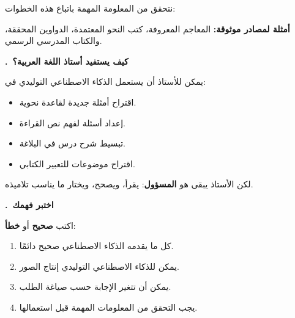 \documentclass[a4paper]{article}
\newcounter{qism}
\newcommand{\qism}[1]{%
    \stepcounter{qism}%
    \par\bigskip
    {\large\khatt\bfseries{\color{asasi}\arabic{qism}.}\ {\color{dakin}#1}}\par
    \vspace{-2pt}{\color{black!20}\rule{\linewidth}{0.6pt}}\par\nopagebreak[4]
    \smallskip}
\newcommand{\kalima}[2][]{\textbf{#2}}
\begin{document}
نتحقق من المعلومة المهمة باتباع هذه الخطوات:

\begin{center}
\end{center}

\textbf{أمثلة لمصادر موثوقة:} المعاجم المعروفة، كتب النحو المعتمدة،
الدواوين المحققة، والكتاب المدرسي الرسمي.

\qism{كيف يستفيد أستاذ اللغة العربية؟}

\begin{arabiyya}
يمكن للأستاذ أن يستعمل الذكاء الاصطناعي التوليدي في:
\begin{itemize}
    \item اقتراح أمثلة جديدة لقاعدة نحوية.
    \item إعداد أسئلة لفهم نص القراءة.
    \item تبسيط شرح درس في البلاغة.
    \item اقتراح موضوعات للتعبير الكتابي.
\end{itemize}
لكن الأستاذ يبقى هو \textbf{المسؤول}:
يقرأ، ويصحح، ويختار ما يناسب تلاميذه.
\end{arabiyya}

\qism{اختبر فهمك}

اكتب \kalima[akhdar]{صحيح} أو \kalima[ahmar]{خطأ}:

\begin{enumerate}
    \item كل ما يقدمه الذكاء الاصطناعي صحيح دائمًا.
    \item يمكن للذكاء الاصطناعي التوليدي إنتاج الصور.
    \item يمكن أن تتغير الإجابة حسب صياغة الطلب.
    \item يجب التحقق من المعلومات المهمة قبل استعمالها.
\end{enumerate}
\end{document}
